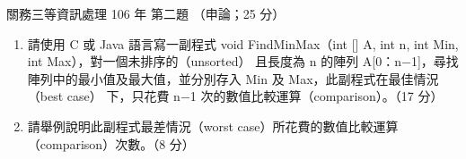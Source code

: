 \begin{pastexam}[label={px:gw3-106-ds-02}]{關務三等資訊處理 106 年 第二題}
（申論；25 分）

\begin{enumerate}[leftmargin=2.6em, labelsep=0.4em]
\item[㈠] 請使用 C 或 Java 語言寫一副程式 void FindMinMax（int [] A, int n, int Min, int Max），對一個未排序的（unsorted）
且長度為 n 的陣列 A[0：n$-$1]，尋找陣列中的最小值及最大值，並分別存入 Min 及 Max，此副程式在最佳情況（best case）
下，只花費 n$-$1 次的數值比較運算（comparison）。（17 分）
\item[㈡] 請舉例說明此副程式最差情況（worst case）所花費的數值比較運算（comparison）次數。（8 分）
\end{enumerate}
\end{pastexam}

